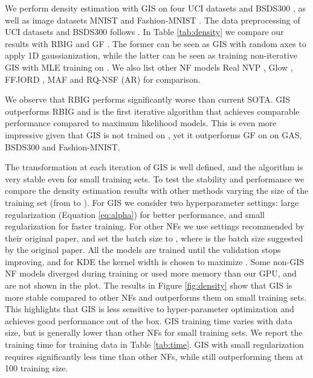 \documentclass{article}
\begin{document}
We perform density estimation with GIS on four UCI datasets \citep{lichman2013uci} and BSDS300  \citep{martin2001database}, as well as image datasets MNIST \citep{lecun1998gradient} and Fashion-MNIST \citep{xiao2017online}. The data preprocessing of UCI datasets and BSDS300 follows \citet{papamakarios2017masked}. In Table \ref{tab:density} we compare our results with RBIG \citep{laparra2011iterative} and GF \citep{meng2020gaussianization}. The former can be seen as GIS with random axes to apply 1D gaussianization, while the latter can be seen as training non-iterative GIS with MLE training on . We also list other NF models Real NVP \citep{dinh2016density}, Glow \citep{kingma2018glow}, FFJORD \citep{grathwohl2018ffjord}, MAF \citep{papamakarios2017masked} and RQ-NSF (AR)\citep{durkan2019neural} for comparison. 

We observe that RBIG performs significantly worse than current SOTA. GIS outperforms RBIG and is the first iterative algorithm that achieves comparable performance compared to maximum likelihood models. This is even more impressive given that GIS is not trained on , yet it outperforms GF on  on GAS, BSDS300 and Fashion-MNIST.

The transformation at each iteration of GIS is well defined, and the algorithm is very stable even for small training sets. To test the stability and performance we compare the density estimation results with other methods 
varying the size of the training set  (from  to ). 
For GIS we consider two hyperparameter settings: large regularization  (Equation \ref{eq:alpha}) for better  performance, and small regularization  for faster training. For other NFs we use settings recommended by their original paper, and set the batch size to , where  is the batch size suggested by the original paper. All the models are trained until the validation  stops improving, and for KDE the kernel width is chosen to maximize . Some non-GIS NF models diverged during training or used more memory than our GPU, and are not shown in the plot. The results in Figure \ref{fig:density} show that GIS is more stable compared to other NFs and outperforms them on small training sets. This highlights that GIS is less sensitive to hyper-parameter optimization and achieves good performance out of the box. GIS training time varies with data size, but is generally lower than other NFs for small training sets. We report the training time for  training data in Table \ref{tab:time}. GIS with small regularization  requires significantly less time than other NFs, while
still outperforming them at 100 training size.
\end{document}
